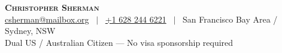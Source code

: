 \documentclass[letterpaper,11pt]{res}
\begin{document}
\noindent \textbf{\Huge \scshape Christopher Sherman} \\
\vspace{0.2cm}
\href{mailto:csherman@mailbox.org}{csherman@mailbox.org} \ $|$ \ \href{tel:+16282446221}{+1 628 244 6221} \ $|$ \ San Francisco Bay Area / Sydney, NSW \\
Dual US / Australian Citizen --- No visa sponsorship required \\











\end{document}
